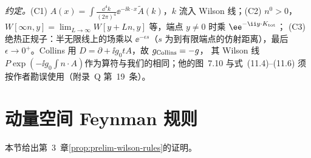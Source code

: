 \emph{约定。}(C1) $A(x)=\int\frac{\dd^4k}{(2\pi)^4}\ee^{-\ii k\cdot x}\tilde A(k)$，$k$ 流入 Wilson 线；(C2) $n^0>0$，$W[\infty n,y]=\lim_{L\to\infty}W[y+Ln,y]$ 等，端点 $y\ne0$ 时乘 $\ee^{-\ii y\cdot K_{\rm tot}}$；
(C3) 绝热正规子：半无限线上的场乘以 $\ee^{-\epsilon s}$（$s$ 为到有限端点的仿射距离），最后 $\epsilon\to0^+$。Collins 用 $D=\partial+\ii g_0tA$\cite[式~(2.2)]{Collins2011}，故 $g_{\rm Collins}=-g$，
其 Wilson 线 $P\exp(-\ii g_0\int n\cdot A)$\cite[式~(13.40)]{Collins2011}作为算符与我们的相同；他的图~7.10 与式~(11.4)--(11.6) 须按作者勘误使用（附录~Q 第~19~条）。

\section{动量空间 Feynman 规则}\label{sec:appB-rules}

本节给出第~3~章\cref{prop:prelim-wilson-rules}的证明。

